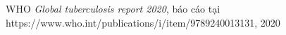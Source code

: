 \begin{thebibliography}{99}
	 WHO {\it Global tuberculosis report 2020}, báo cáo tại https://www.who.int/publications/i/item/9789240013131, 2020   
\end{thebibliography}
%